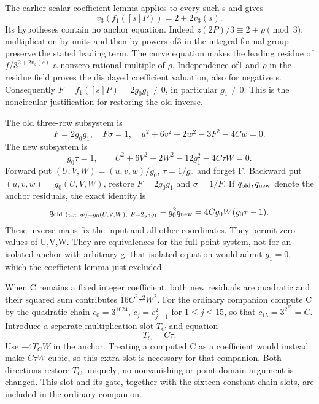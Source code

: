 The earlier scalar coefficient lemma applies to every such s and gives
\[
 v_3(f_1([s]P))=2+2v_3(s).
\]
Its hypotheses contain no anchor equation. Indeed
$z(2P)/3\equiv2+\rho\pmod3$; multiplication by units and then by
powers of3 in the integral formal group preserve the stated leading
term. The curve equation makes the leading residue of
$f/3^{2+2v_3(s)}$ a nonzero rational multiple of $\rho$.
Independence of1 and $\rho$ in the residue field proves the displayed
coefficient valuation, also for negative s. Consequently
$F=f_1([s]P)=2g_0g_1\ne0$, in particular $g_1\ne0$.
This is the noncircular justification for restoring the old inverse.

The old three-row subsystem is
\[
 F=2g_0g_1,\quad F\sigma=1,\quad
 u^2+6v^2-2w^2-3F^2-4Cw=0.
\]
The new subsystem is
\[
 g_0\tau=1,\qquad
 U^2+6V^2-2W^2-12g_1^2-4C\tau W=0.
\]
Forward put $(U,V,W)=(u,v,w)/g_0$, $\tau=1/g_0$ and forget F.
Backward put $(u,v,w)=g_0(U,V,W)$, restore $F=2g_0g_1$ and
$\sigma=1/F$. If $q_{\rm old},q_{\rm new}$ denote the anchor residuals,
the exact identity is
\[
 q_{\rm old}|_{(u,v,w)=g_0(U,V,W),\ F=2g_0g_1}
       -g_0^2q_{\rm new}
       =4Cg_0W(g_0\tau-1).
\]
These inverse maps fix the input and all other coordinates. They permit
zero values of U,V,W. They are equivalences for the full point system,
not for an isolated anchor with arbitrary g: that isolated equation
would admit $g_1=0$, which the coefficient lemma just excluded.

When C remains a fixed integer coefficient, both new residuals are
quadratic and their squared sum contributes $16C^2\tau^2W^2$.
For the ordinary companion compute C by the quadratic chain
$c_0=3^{1024}$, $c_j=c_{j-1}^2$ for $1\le j\le15$, so that
$c_{15}=3^{2^{25}}=C$. Introduce a separate multiplication
slot $T_C$ and equation
\[
                 T_C=C\tau.
\]
Use $-4T_CW$ in the anchor. Treating a computed C as a coefficient would
instead make $C\tau W$ cubic, so this extra slot is necessary for that
companion. Both directions restore $T_C$ uniquely; no nonvanishing or
point-domain argument is changed. This slot and its gate, together with the sixteen constant-chain slots,
are included in the ordinary companion.

